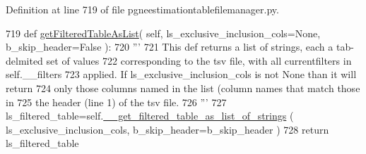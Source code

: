 Definition at line 719 of file pgneestimationtablefilemanager.\+py.


\begin{DoxyCode}
719     \textcolor{keyword}{def }\hyperlink{classnegui_1_1pgneestimationtablefilemanager_1_1NeEstimationTableFileManager_adb06c0cd0ae4870590638905c8ea05a9}{getFilteredTableAsList}( self, ls\_exclusive\_inclusion\_cols=None, 
      b\_skip\_header=False ):
720         \textcolor{stringliteral}{'''}
721 \textcolor{stringliteral}{        This def returns a list of strings, each a tab-delmited set of values}
722 \textcolor{stringliteral}{        corresponding to the tsv file, with all currentfilters in self.\_\_filters}
723 \textcolor{stringliteral}{        applied.  If ls\_exclusive\_inclusion\_cols is not None than it will return}
724 \textcolor{stringliteral}{        only those columns named in the list (column names that match those in }
725 \textcolor{stringliteral}{        the header (line 1) of the tsv file.}
726 \textcolor{stringliteral}{        '''}
727         ls\_filtered\_table=self.\hyperlink{classnegui_1_1pgneestimationtablefilemanager_1_1NeEstimationTableFileManager_a32ff581469a25ac1582e3e68c4e814bd}{\_\_get\_filtered\_table\_as\_list\_of\_strings}
      ( ls\_exclusive\_inclusion\_cols, b\_skip\_header=b\_skip\_header )
728         \textcolor{keywordflow}{return} ls\_filtered\_table
\end{DoxyCode}
